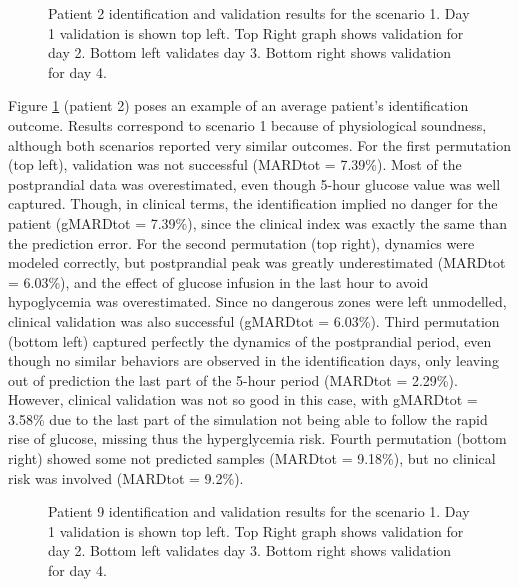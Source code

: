 \begin{figure}[hbtp]
\centering
{}\caption{Patient 2 identification and validation results for the scenario 1. Day 1 validation is shown top left. Top Right graph shows validation for day 2. Bottom left validates day 3. Bottom right shows validation for day 4.}
\label{fig:pacient2}
\end{figure}

Figure \ref{fig:pacient2} (patient 2) poses an example of an average patient's identification outcome. Results correspond to scenario 1 because of physiological soundness, although both scenarios reported very similar outcomes. For the first permutation (top left), validation was not successful (MARDtot = 7.39\%). Most of the postprandial data was overestimated, even though 5-hour glucose value was well captured. Though, in clinical terms, the identification implied no danger for the patient (gMARDtot = 7.39\%), since the clinical index was exactly the same than the prediction error. For the second permutation (top right), dynamics were modeled correctly, but postprandial peak was greatly underestimated (MARDtot = 6.03\%), and the effect of glucose infusion in the last hour to avoid hypoglycemia was overestimated. Since no dangerous zones were left unmodelled, clinical validation was also successful (gMARDtot = 6.03\%). Third permutation (bottom left) captured perfectly the dynamics of the postprandial period, even though no similar behaviors are observed in the identification days, only leaving out of prediction the last part of the 5-hour period (MARDtot = 2.29\%). However, clinical validation was not so good in this case, with gMARDtot = 3.58\% due to the last part of the simulation not being able to follow the rapid rise of glucose, missing thus the hyperglycemia risk. Fourth permutation (bottom right) showed some not predicted samples (MARDtot = 9.18\%), but no clinical risk was involved (MARDtot = 9.2\%).

\begin{figure}[hbtp]
\centering
{}\caption{Patient 9 identification and validation results for the scenario 1. Day 1 validation is shown top left. Top Right graph shows validation for day 2. Bottom left validates day 3. Bottom right shows validation for day 4.}
\label{fig:pacient9}
\end{figure}

